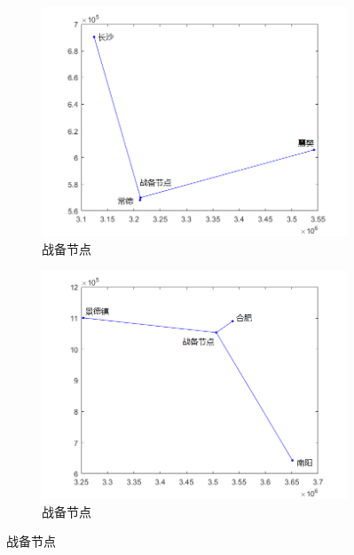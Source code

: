 \documentclass{article}
\begin{document}
\begin{figure}[htpb]
	\centering
	\begin{subfigure}[htpb]{.45\linewidth}
		\centering
		\includegraphics[width=\linewidth]{311.png}
		\caption{战备节点}
		\label{fig:战备节点\chinese{subfigure}\arabic{subsection}}
	\end{subfigure}
	\quad
	\begin{subfigure}[htpb]{.45\linewidth}
		\centering
		\includegraphics[width=\linewidth]{321.png}
		\caption{战备节点}
		\label{fig:战备节点\chinese{subfigure}\arabic{subsection}}
	\end{subfigure}
	\caption{战备节点}
	\label{fig:战备节点\arabic{subsection}}
\end{figure}
\end{document}
